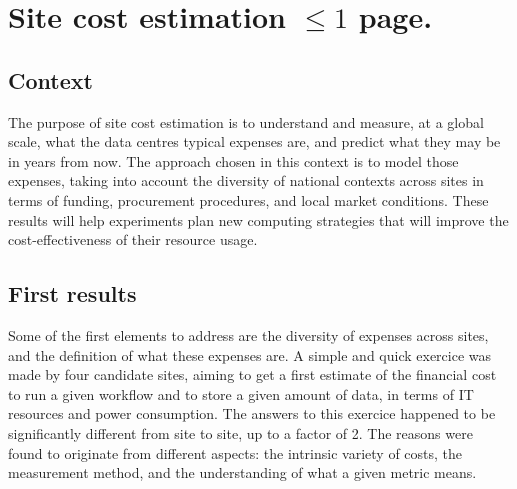 \section{Site cost estimation $\leq 1$ page.}

\subsection{Context}

The purpose of site cost estimation is to understand and measure, at a global scale,
what the data centres typical expenses are, and predict what they may be in years from now.
The approach chosen in this context is to model those expenses, taking into account the diversity of national contexts
across sites in terms of funding, procurement procedures, and local market conditions.
These results will help experiments plan new computing strategies that
will improve the cost-effectiveness of their resource usage.

\subsection{First results}

Some of the first elements to address are the diversity of expenses across sites, and the definition of what these
expenses are.
A simple and quick exercice was made by four candidate sites, aiming to get a first estimate of the financial cost to run
a given workflow and to store a given amount of data, in terms of IT resources and power consumption.
The answers to this exercice happened to be significantly different from site to site, up to a factor of 2.
The reasons were found to originate from different aspects: the intrinsic variety of costs, the measurement method, and
the understanding of what a given metric means.

